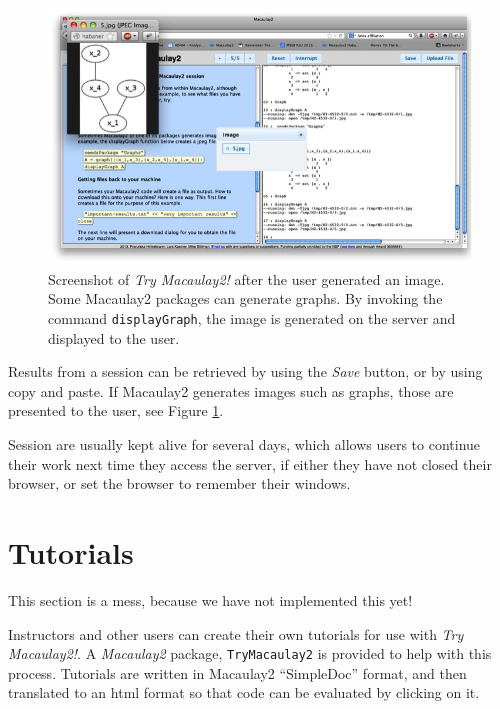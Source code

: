\documentclass[]{article}
\def\tryM2{{\it Try Macaulay2!}}
\def\M2{{\it Macaulay2}}
\begin{document}

\begin{figure}[htb]
    \includegraphics[width=.95\textwidth]{withGraph.jpg}
    \caption{Screenshot of \tryM2 after the user
      generated an image. Some Macaulay2 packages can generate
      graphs. By invoking the command {\tt displayGraph}, the image is
      generated on the server and displayed to the user.}
    \label{fig:graph}
\end{figure}

Results from a session can be retrieved by using the {\it Save}
button, or by using copy and paste. If Macaulay2 generates
images such as graphs, those are presented to the user, see Figure \ref{fig:graph}.


Session are usually kept alive for several days, which allows users to
continue their work next time they access the server, if either they
have not closed their browser, or set the browser to remember their
windows.

\section{Tutorials}
This section is a mess, because we have not implemented this yet!

Instructors and other users can create their own tutorials for use with \tryM2.
A \M2 package, {\tt TryMacaulay2} is provided to help with this process.  
Tutorials are written in Macaulay2 ``SimpleDoc'' format, and then translated to an html format
so that code can be evaluated by clicking on it.
\end{document}
